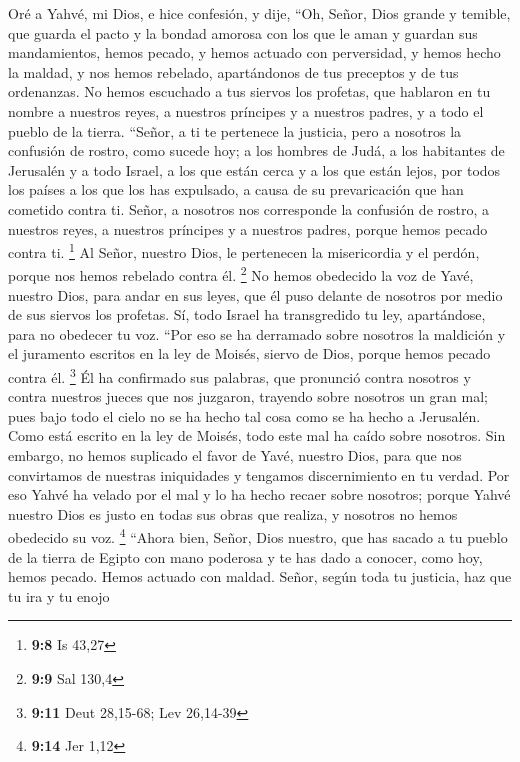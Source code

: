 \begin{paracol}{2}
 Oré a Yahvé, mi Dios, e hice confesión, y dije, ``Oh,
Señor, Dios grande y temible, que guarda el pacto y la bondad amorosa
con los que le aman y guardan sus mandamientos,  hemos
pecado, y hemos actuado con perversidad, y hemos hecho la maldad, y nos
hemos rebelado, apartándonos de tus preceptos y de tus ordenanzas.
 No hemos escuchado a tus siervos los profetas, que
hablaron en tu nombre a nuestros reyes, a nuestros príncipes y a
nuestros padres, y a todo el pueblo de la tierra. 
``Señor, a ti te pertenece la justicia, pero a nosotros la confusión de
rostro, como sucede hoy; a los hombres de Judá, a los habitantes de
Jerusalén y a todo Israel, a los que están cerca y a los que están
lejos, por todos los países a los que los has expulsado, a causa de su
prevaricación que han cometido contra ti.  Señor, a
nosotros nos corresponde la confusión de rostro, a nuestros reyes, a
nuestros príncipes y a nuestros padres, porque hemos pecado contra ti.
\footnote{\textbf{9:8} Is 43,27}  Al Señor, nuestro Dios,
le pertenecen la misericordia y el perdón, porque nos hemos rebelado
contra él. \footnote{\textbf{9:9} Sal 130,4}  No hemos
obedecido la voz de Yavé, nuestro Dios, para andar en sus leyes, que él
puso delante de nosotros por medio de sus siervos los profetas.
 Sí, todo Israel ha transgredido tu ley, apartándose,
para no obedecer tu voz. ``Por eso se ha derramado sobre nosotros la
maldición y el juramento escritos en la ley de Moisés, siervo de Dios,
porque hemos pecado contra él. \footnote{\textbf{9:11} Deut 28,15-68;
  Lev 26,14-39}  Él ha confirmado sus palabras, que
pronunció contra nosotros y contra nuestros jueces que nos juzgaron,
trayendo sobre nosotros un gran mal; pues bajo todo el cielo no se ha
hecho tal cosa como se ha hecho a Jerusalén.  Como está
escrito en la ley de Moisés, todo este mal ha caído sobre nosotros. Sin
embargo, no hemos suplicado el favor de Yavé, nuestro Dios, para que nos
convirtamos de nuestras iniquidades y tengamos discernimiento en tu
verdad.  Por eso Yahvé ha velado por el mal y lo ha hecho
recaer sobre nosotros; porque Yahvé nuestro Dios es justo en todas sus
obras que realiza, y nosotros no hemos obedecido su voz. \footnote{\textbf{9:14}
  Jer 1,12}  ``Ahora bien, Señor, Dios nuestro, que has
sacado a tu pueblo de la tierra de Egipto con mano poderosa y te has
dado a conocer, como hoy, hemos pecado. Hemos actuado con maldad.
 Señor, según toda tu justicia, haz que tu ira y tu enojo

\end{paracol}

